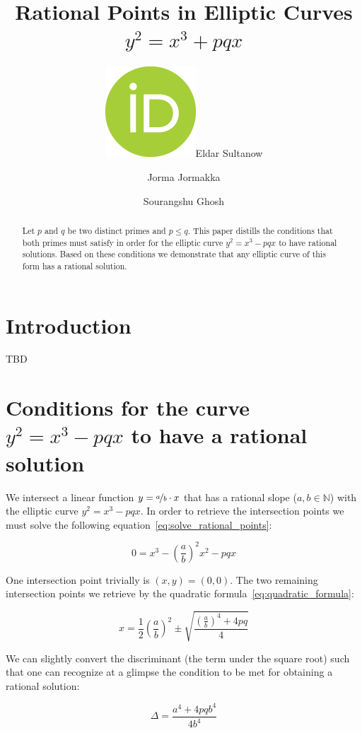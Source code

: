 \documentclass[12pt]{amsart}
\title[Rational Points in Elliptic Curves]{Rational Points in Elliptic Curves \boldmath$y^2=x^3+pqx$}
\author[E.\ Sultanow]{\href{https://orcid.org/0000-0001-5257-2236}{\includegraphics[scale=0.06]{orcid.png}}\hspace{1mm}Eldar Sultanow}
\author[J.\ Jormakka]{Jorma Jormakka}
\author[S.\ Ghosh]{Sourangshu Ghosh}
\theoremstyle{definition}
\begin{document}
	
\begingroup
\let\MakeUppercase\relax
\maketitle
\endgroup

\begin{abstract}
Let $p$ and $q$ be two distinct primes and $p\le q$. This paper distills the conditions that both primes must satisfy in order for the elliptic curve $y^2=x^3-pqx$ to have rational solutions. Based on these conditions we demonstrate that any elliptic curve of this form has a rational solution.
\end{abstract}

\newpage
\section{Introduction}
\label{introduction}
TBD

\section{\texorpdfstring{Conditions for the curve $y^2=x^3-pqx$ to have a rational solution}{Conditions for the curve y2=x3-pqx to have a rational solution}}
\label{conditions}

We intersect a linear function $y=\nicefrac{a}{b}\cdot x$ that has a rational slope ($a,b\in\mathbb{N}$) with the elliptic curve $y^2=x^3-pqx$. In order to retrieve the intersection points we must solve the following equation~\ref{eq:solve_rational_points}:

\begin{equation}
\label{eq:solve_rational_points}
0=x^3-\left(\frac{a}{b}\right)^2x^2-pqx
\end{equation}

One intersection point trivially is $(x,y)=(0,0)$. The two remaining intersection points we retrieve by the quadratic formula~\ref{eq:quadratic_formula}:

\begin{equation}
\label{eq:quadratic_formula}
x=\frac{1}{2}\left(\frac{a}{b}\right)^2\pm\sqrt{\frac{\left(\frac{a}{b}\right)^4+4pq}{4}}
\end{equation}

We can slightly convert the discriminant (the term under the square root) such that one can recognize at a glimpse the condition to be met for obtaining a rational solution:

\begin{equation}
\label{eq:discriminant}
\Delta=\frac{a^4+4pqb^4}{4b^4}
\end{equation}
\end{document}
